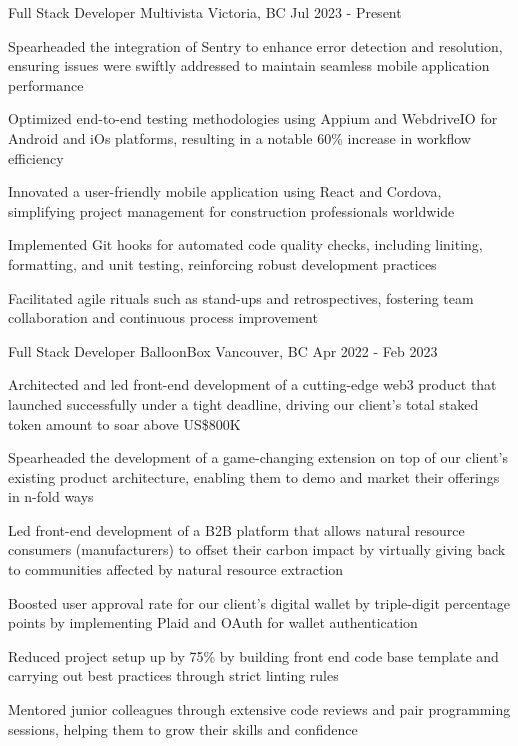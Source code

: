 
\begin{cventries}
  \cventry
    {Full Stack Developer} %
    {Multivista} %
    {Victoria, BC} %
    {Jul 2023 - Present} %
    {
      \begin{cvitems} %
        \item{Spearheaded the integration of Sentry to enhance error detection and resolution, ensuring issues were swiftly addressed to maintain seamless mobile application performance}
        \item{Optimized end-to-end testing methodologies using Appium and WebdriveIO for Android and iOs platforms, resulting in a notable 60\% increase in workflow efficiency}
        \item{Innovated a user-friendly mobile application using React and Cordova, simplifying project management for construction professionals worldwide}
        \item{Implemented Git hooks for automated code quality checks, including liniting, formatting, and unit testing, reinforcing robust development practices}
        \item{Facilitated agile rituals such as stand-ups and retrospectives, fostering team collaboration and continuous process improvement}
      \end{cvitems}
    }

  \cventry
    {Full Stack Developer} %
    {BalloonBox} %
    {Vancouver, BC} %
    {Apr 2022 - Feb 2023} %
    {
      \begin{cvitems} %
        \item{Architected and led front-end development of a cutting-edge web3 product that launched successfully under a tight deadline, driving our client's total staked token amount to soar above US\$800K}
        \item{Spearheaded the development of a game-changing extension on top of our client's existing product architecture, enabling them to demo and market their offerings in n-fold ways}
        \item{Led front-end development of a B2B platform that allows natural resource consumers (manufacturers) to offset their carbon impact by virtually giving back to communities affected by natural resource extraction}
        \item{Boosted user approval rate for our client's digital wallet by triple-digit percentage points by implementing Plaid and OAuth for wallet authentication}
        \item{Reduced project setup up by 75\% by building front end code base template and carrying out best practices through strict linting rules}
        \item{Mentored junior colleagues through extensive code reviews and pair programming sessions, helping them to grow their skills and confidence}
      \end{cvitems}
    }


\end{cventries}
